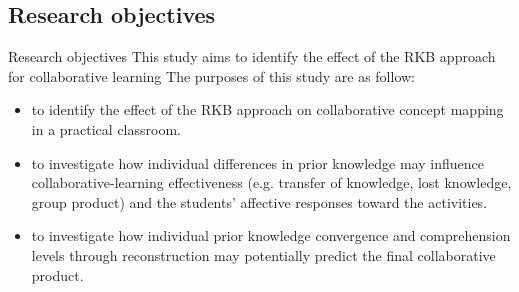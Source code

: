 \subsection{Research objectives}
\begin{frame}{Research objectives}
    This study aims to identify the effect of the RKB approach
    for collaborative learning
    The purposes of this study are as follow:
    \begin{itemize}
        \item <+-> to identify the effect of the RKB approach on collaborative 
              concept mapping in a practical classroom.
        \item <+-> to investigate how individual differences in prior knowledge 
              may influence collaborative-learning effectiveness 
              (e.g. transfer of knowledge, lost knowledge, group product) 
              and the students' affective responses toward the activities. 
        \item <+-> to investigate how individual prior knowledge convergence and comprehension 
            levels through reconstruction may potentially predict the final 
            collaborative product. 
    \end{itemize} 
\end{frame}